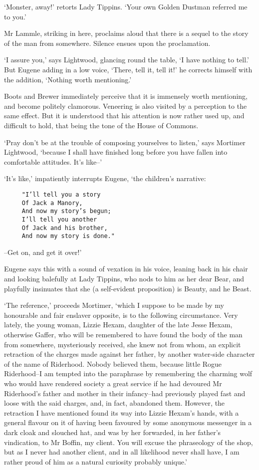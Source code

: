 ‘Monster, away!’ retorts Lady Tippins. ‘Your own Golden Dustman referred
me to you.’

Mr Lammle, striking in here, proclaims aloud that there is a sequel
to the story of the man from somewhere. Silence ensues upon the
proclamation.

‘I assure you,’ says Lightwood, glancing round the table, ‘I have
nothing to tell.’ But Eugene adding in a low voice, ‘There, tell
it, tell it!’ he corrects himself with the addition, ‘Nothing worth
mentioning.’

Boots and Brewer immediately perceive that it is immensely worth
mentioning, and become politely clamorous. Veneering is also visited by
a perception to the same effect. But it is understood that his attention
is now rather used up, and difficult to hold, that being the tone of the
House of Commons.

‘Pray don’t be at the trouble of composing yourselves to listen,’ says
Mortimer Lightwood, ‘because I shall have finished long before you have
fallen into comfortable attitudes. It’s like--’

‘It’s like,’ impatiently interrupts Eugene, ‘the children’s narrative:

\begin{verbatim}
     "I’ll tell you a story
     Of Jack a Manory,
     And now my story’s begun;
     I’ll tell you another
     Of Jack and his brother,
     And now my story is done."
\end{verbatim}

--Get on, and get it over!’

Eugene says this with a sound of vexation in his voice, leaning back in
his chair and looking balefully at Lady Tippins, who nods to him as
her dear Bear, and playfully insinuates that she (a self-evident
proposition) is Beauty, and he Beast.

‘The reference,’ proceeds Mortimer, ‘which I suppose to be made by my
honourable and fair enslaver opposite, is to the following circumstance.
Very lately, the young woman, Lizzie Hexam, daughter of the late Jesse
Hexam, otherwise Gaffer, who will be remembered to have found the body
of the man from somewhere, mysteriously received, she knew not from
whom, an explicit retraction of the charges made against her father, by
another water-side character of the name of Riderhood. Nobody believed
them, because little Rogue Riderhood--I am tempted into the paraphrase
by remembering the charming wolf who would have rendered society a great
service if he had devoured Mr Riderhood’s father and mother in their
infancy--had previously played fast and loose with the said charges,
and, in fact, abandoned them. However, the retraction I have mentioned
found its way into Lizzie Hexam’s hands, with a general flavour on it
of having been favoured by some anonymous messenger in a dark cloak and
slouched hat, and was by her forwarded, in her father’s vindication, to
Mr Boffin, my client. You will excuse the phraseology of the shop, but
as I never had another client, and in all likelihood never shall have, I
am rather proud of him as a natural curiosity probably unique.’

